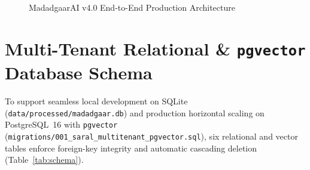 \documentclass[12pt,a4paper,oneside]{report}
\begin{document}
\begin{figure}[H]
\caption{MadadgaarAI v4.0 End-to-End Production Architecture}
\label{fig:architecture}
\end{figure}

\section{Multi-Tenant Relational \& \texttt{pgvector} Database Schema}
To support seamless local development on SQLite (\texttt{data/processed/madadgaar.db}) and production horizontal scaling on PostgreSQL~16 with \texttt{pgvector} (\texttt{migrations/001\_saral\_multitenant\_pgvector.sql}), six relational and vector tables enforce foreign-key integrity and automatic cascading deletion (Table~\ref{tab:schema}).
\end{document}
